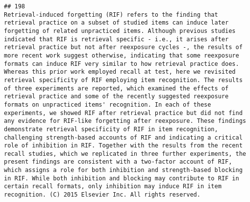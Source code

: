 \documentclass[
  english,
  man]{apa6}
\begin{document}
\begin{verbatim}
## 198                                                                                                                                                                                                                                                                                                                                                                                                                                                                                                                                                                                                                                                                                                                                                                                                                                                                                                                                                                                                                                                                                        Retrieval-induced forgetting (RIF) refers to the finding that retrieval practice on a subset of studied items can induce later forgetting of related unpracticed items. Although previous studies indicated that RIF is retrieval specific - i.e., it arises after retrieval practice but not after reexposure cycles -, the results of more recent work suggest otherwise, indicating that some reexposure formats can induce RIF very similar to how retrieval practice does. Whereas this prior work employed recall at test, here we revisited retrieval specificity of RIF employing item recognition. The results of three experiments are reported, which examined the effects of retrieval practice and some of the recently suggested reexposure formats on unpracticed items' recognition. In each of these experiments, we showed RIF after retrieval practice but did not find any evidence for RIF-like forgetting after reexposure. These findings demonstrate retrieval specificity of RIF in item recognition, challenging strength-based accounts of RIF and indicating a critical role of inhibition in RIF. Together with the results from the recent recall studies, which we replicated in three further experiments, the present findings are consistent with a two-factor account of RIF, which assigns a role for both inhibition and strength-based blocking in RIF. While both inhibition and blocking may contribute to RIF in certain recall formats, only inhibition may induce RIF in item recognition. (C) 2015 Elsevier Inc. All rights reserved.

\end{verbatim}
\end{document}
